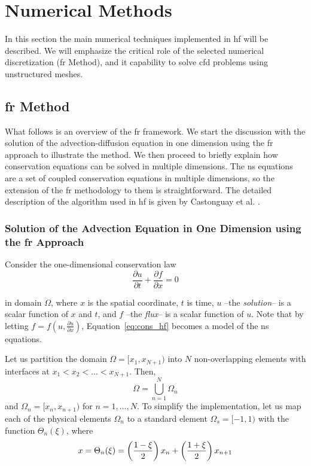 
\section{Numerical Methods}
\label{sec:numerics}

In this section the main numerical techniques implemented in \gls{hf} will be described. We will emphasize the critical role of the selected numerical discretization (\gls{fr} Method), and it capability to solve \gls{cfd} problems using unstructured meshes. 

\subsection{\gls{fr} Method}

What follows is an overview of the \gls{fr} framework. We start the discussion with the solution of the advection-diffusion equation in one dimension using the \gls{fr} approach to illustrate the method. We then proceed to briefly explain how conservation equations can be solved in multiple dimensions. The \gls{ns} equations are a set of coupled conservation equations in multiple dimensions, so the extension of the \gls{fr} methodology to them is straightforward. The detailed description of the algorithm used in \gls{hf} is given by Castonguay et al. \cite{castonguay2011}.

\subsubsection{Solution of the Advection Equation in One Dimension using the \gls{fr} Approach}

Consider the one-dimensional conservation law
\begin{equation}
\label{eq:cons_hf}
\frac{\partial u}{\partial t} + \frac{\partial f}{\partial x} = 0
\end{equation}

in domain $\Omega$, where $x$ is the spatial coordinate, $t$ is time, $u$ --the \emph{solution}-- is a scalar function of $x$ and $t$, and $f$ --the \emph{flux}-- is a scalar function of $u$. Note that by letting $f = f(u,\frac{\partial u}{\partial x})$, Equation~\ref{eq:cons_hf} becomes a model of the \gls{ns} equations.

Let us partition the domain $\Omega = [x_1,x_{N+1})$ into $N$ non-overlapping elements with 
interfaces at $x_1<x_2<...<x_{N+1}$. Then,
\begin{equation}
\Omega = \bigcup^N_{n=1} \Omega_n
\end{equation}
and $\Omega_n = [x_n,x_{n+1})$ for $n = 1,...,N$. To simplify the implementation, let us map each of the physical elements $\Omega_n$ to a standard element $\Omega_s=[-1,1)$ with the function $\Theta_n(\xi)$, where
\begin{equation}
x = \Theta_n(\xi) = \left( \frac{1-\xi}{2} \right) x_n + \left(\frac{1+\xi}{2}\right) x_{n+1} 
\end{equation}

